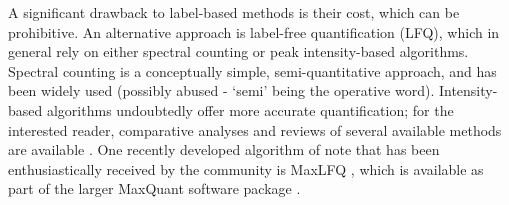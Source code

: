 \documentclass[a4paper,11pt,twoside,openright]{scrbook}
\begin{document}
A significant drawback to label-based methods is their cost, which can be prohibitive. An alternative approach is label-free quantification (LFQ), which in general rely on either spectral counting \cite{Liu2004,Zybailov2005} or peak intensity-based algorithms. Spectral counting is a conceptually simple, semi-quantitative approach, and has been widely used (possibly abused \cite{Lundgren2010} - `semi' being the operative word). Intensity-based algorithms undoubtedly offer more accurate quantification; for the interested reader, comparative analyses and reviews of several available methods are available \cite{Nahnsen2013,Fabre2014}. One recently developed algorithm of note that has been enthusiastically received by the community is MaxLFQ \cite{Cox2014}, which is available as part of the larger MaxQuant software package \cite{Cox2008}.




\end{document}
